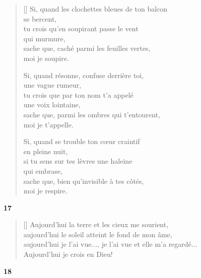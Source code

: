 \documentclass[a4paper,12pt]{book}
\begin{document}
\begin{verse}[\versewidth]
  Si, quand les clochettes bleues de ton balcon \\
  se bercent, \\
  tu crois qu'en soupirant passe le vent \\
  qui murmure, \\
  sache que, caché parmi les feuilles vertes, \\
  moi je soupire.

  Si, quand résonne, confuse derrière toi, \\
  une vague rumeur, \\
  tu crois que par ton nom t'a appelé \\
  une voix lointaine, \\
  sache que, parmi les ombres qui t'entourent, \\
  moi je t'appelle.

  Si, quand se trouble ton cœur craintif \\
  en pleine nuit, \\
  si tu sens sur tes lèvres une haleine \\
  qui embrase, \\
  sache que, bien qu'invisible à tes côtés, \\
  moi je respire.
\end{verse}

\bigskip

\begin{center}
  \textbf{17}
\end{center}

\settowidth{\versewidth}{aujourd'hui je l'ai vue..., je l'ai vue et elle m'a regardé...}

\begin{verse}[\versewidth]
  Aujourd'hui la terre et les cieux me sourient, \\
  aujourd'hui le soleil atteint le fond de mon âme, \\
  aujourd'hui je l'ai vue..., je l'ai vue et elle m'a regardé... \\
  Aujourd'hui je crois en Dieu!
\end{verse}

\bigskip

\begin{center}
  \textbf{18}
\end{center}
\end{document}
